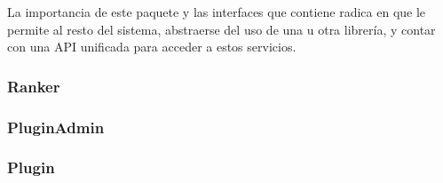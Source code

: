   La importancia de este paquete y las interfaces que contiene radica en que le
permite al resto del sistema, abstraerse del uso de una u otra librer\'ia, y
contar con una API unificada para acceder a estos servicios.    

  \subsubsection{Ranker}
  \subsubsection{PluginAdmin}
  \subsubsection{Plugin}